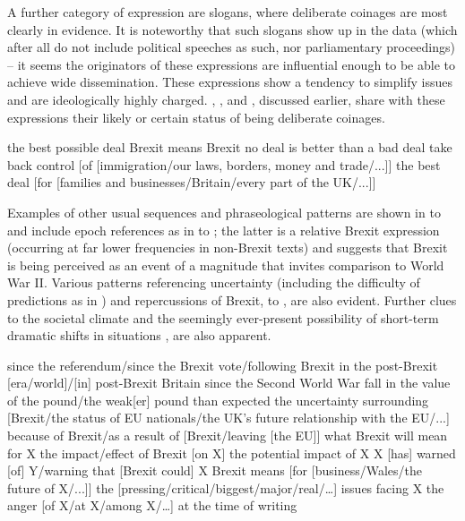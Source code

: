 \documentclass[output=paper]{langscibook}
\begin{document}
A further category of expression are slogans, where deliberate coinages are most clearly in evidence. It is noteworthy that such slogans show up in the data (which after all do not include political speeches as such, nor parliamentary proceedings) -- it seems the originators of these expressions are influential enough to be able to achieve wide dissemination. These expressions show a tendency to simplify issues and are ideologically highly charged. , ,  and , discussed earlier, share with these expressions their likely or certain status of being deliberate coinages.

\ea the best possible deal\label{ex:buerki:33}
\ex Brexit means Brexit\label{ex:buerki:34}
\ex no deal is better than a bad deal\label{ex:buerki:35}
\ex take back control [of [immigration\slash our laws, borders, money and trade\slash ...]]\label{ex:buerki:36}
\ex the best deal [for [families and businesses\slash Britain\slash every part of the UK\slash ...]]\label{ex:buerki:37}
\z                                                                                                    

Examples of other usual sequences and phraseological patterns are shown in  to  and include epoch references as in  to ; the latter is a relative Brexit expression (occurring at far lower frequencies in non-Brexit texts) and suggests that Brexit is being perceived as an event of a magnitude that invites comparison to World War II. Various patterns referencing uncertainty (including the difficulty of predictions as in ) and repercussions of Brexit,  to , are also evident. Further clues to the societal climate  and the seemingly ever-present possibility of short-term dramatic shifts in situations , are also apparent.

\ea since the referendum\slash since the Brexit vote\slash following Brexit\label{ex:buerki:38}
\ex in the post-Brexit [era/world]\slash [in] post-Brexit Britain\label{ex:buerki:39}
\ex since the Second World War\label{ex:buerki:40}
\ex fall in the value of the pound\slash the weak[er] pound\label{ex:buerki:41}
\ex{} than expected\label{ex:buerki:42}
\ex the uncertainty surrounding [Brexit/the status of EU nationals/the UK's future relationship with the EU/...]\label{ex:buerki:43}
\ex because of Brexit\slash as a result of [Brexit/leaving [the EU]]\label{ex:buerki:44}
\ex what Brexit will mean for X\label{ex:buerki:45}
\ex{} the impact/effect of Brexit [on X]\label{ex:buerki:46}
\ex the potential impact of X\label{ex:buerki:47}
\ex X [has] warned [of] Y\slash warning that [Brexit could] X\label{ex:buerki:48}
\ex\relax [what] Brexit means [for [business/Wales/the future of X/...]]\label{ex:buerki:49}
\ex the [pressing/critical/biggest/major/real/…] issues facing X\label{ex:buerki:50}
\ex the anger [of X\slash at X\slash among X\slash …]\label{ex:buerki:51}
\ex at the time of writing\label{ex:buerki:52}
\z
\end{document}
